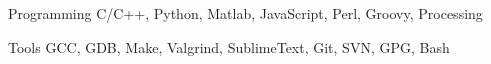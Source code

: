 

\begin{cvskills}

  \cvskill
    {Programming} %
    {C/C++, Python, Matlab, JavaScript, Perl, Groovy, Processing} %

  \cvskill
    {Tools} %
    {GCC, GDB, Make, Valgrind, SublimeText, Git, SVN, GPG, Bash} %

\end{cvskills}
